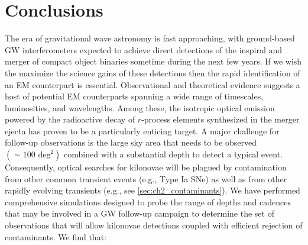 \section{Conclusions}
\label{sec:ch2_conc}
The era of gravitational wave astronomy is fast approaching, with ground-based GW interferometers expected to achieve direct detections of the inspiral and merger of compact object binaries sometime during the next few years. If we wish the maximize the science gains of these detections then the rapid identification of an EM counterpart is essential.  Observational and theoretical evidence suggests a host of potential EM counterparts spanning a wide range of timescales, luminosities, and wavelengths. Among these, the isotropic optical emission powered by the radioactive decay of $r$-process elements synthesized in the merger ejecta has proven to be a particularly enticing target. A major challenge for follow-up observations is the large sky area that needs to be observed $(\sim100\text{ deg}^2)$ combined with a substantial depth to detect a typical event. Consequently, optical searches for kilonovae will be plagued by contamination from other common transient events (e.g., Type Ia SNe) as well as from other rapidly evolving transients (e.g., see \cref{sec:ch2_contaminants}). We have performed comprehensive simulations designed to probe the range of depths and cadences that may be involved in a GW follow-up campaign to determine the set of observations that will allow kilonovae detections coupled with efficient rejection of contaminants. We find that:

